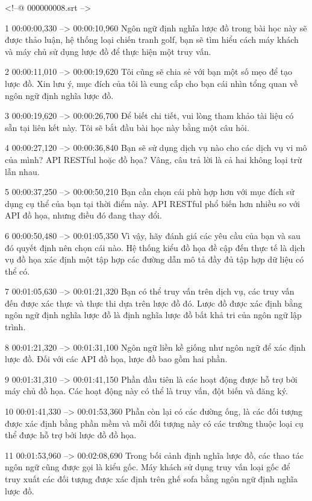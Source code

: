 <!--@ 000000008.srt -->

1
00:00:00,330 --> 00:00:10,960
Ngôn ngữ định nghĩa lược đồ trong bài học này sẽ được thảo luận, hệ thống loại chiến tranh golf, bạn sẽ tìm hiểu cách máy khách và máy chủ sử dụng lược đồ để thực hiện một truy vấn.

2
00:00:11,010 --> 00:00:19,620
Tôi cũng sẽ chia sẻ với bạn một số mẹo để tạo lược đồ.  Xin lưu ý, mục đích của tôi là cung cấp cho bạn cái nhìn tổng quan về ngôn ngữ định nghĩa lược đồ.

3
00:00:19,620 --> 00:00:26,700
Để biết chi tiết, vui lòng tham khảo tài liệu có sẵn tại liên kết này.  Tôi sẽ bắt đầu bài học này bằng một câu hỏi.

4
00:00:27,120 --> 00:00:36,840
Bạn sẽ sử dụng dịch vụ nào cho các dịch vụ vi mô của mình?  API RESTful hoặc đồ họa?  Vâng, câu trả lời là cả hai không loại trừ lẫn nhau.

5
00:00:37,250 --> 00:00:50,210
Bạn cần chọn cái phù hợp hơn với mục đích sử dụng cụ thể của bạn tại thời điểm này.  API RESTful phổ biến hơn nhiều so với API đồ họa, nhưng điều đó đang thay đổi.

6
00:00:50,480 --> 00:01:05,350
Vì vậy, hãy đánh giá các yêu cầu của bạn và sau đó quyết định nên chọn cái nào.  Hệ thống kiểu đồ họa đề cập đến thực tế là dịch vụ đồ họa xác định một tập hợp các đường dẫn mô tả đầy đủ tập hợp dữ liệu có thể có.

7
00:01:05,630 --> 00:01:21,320
Bạn có thể truy vấn trên dịch vụ, các truy vấn đến được xác thực và thực thi dựa trên lược đồ đó.  Lược đồ được xác định bằng ngôn ngữ định nghĩa lược đồ là định nghĩa lược đồ bất khả tri của ngôn ngữ lập trình.

8
00:01:21,320 --> 00:01:31,100
Ngôn ngữ liền kề giống như ngôn ngữ để xác định lược đồ.  Đối với các API đồ họa, lược đồ bao gồm hai phần.

9
00:01:31,310 --> 00:01:41,150
Phần đầu tiên là các hoạt động được hỗ trợ bởi máy chủ đồ họa.  Các hoạt động này có thể là truy vấn, đột biến và đăng ký.

10
00:01:41,330 --> 00:01:53,360
Phần còn lại có các đường ống, là các đối tượng được xác định bằng phần mềm và mỗi đối tượng này có các trường thuộc loại cụ thể được hỗ trợ bởi lược đồ đồ họa.

11
00:01:53,960 --> 00:02:08,690
Trong bối cảnh định nghĩa lược đồ, các thao tác ngôn ngữ cũng được gọi là kiểu gốc.  Máy khách sử dụng truy vấn loại gốc để truy xuất các đối tượng được xác định trên ghế sofa bằng ngôn ngữ định nghĩa lược đồ.

